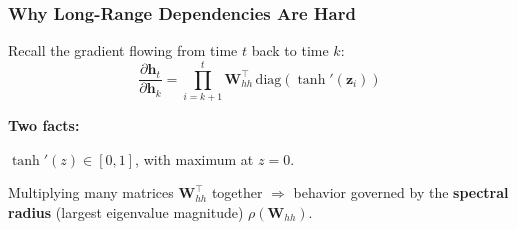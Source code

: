 \documentclass[notes,11pt, aspectratio=169]{beamer}
\newenvironment{wideitemize}{\itemize\addtolength{\itemsep}{10pt}}{\enditemize}
\newcommand{\vh}{\mathbf{h}}
\newcommand{\vz}{\mathbf{z}}
\newcommand{\vW}{\mathbf{W}}
\newcommand{\pd}[2]{\frac{\partial #1}{\partial #2}}
\begin{document}
\begin{frame}
\frametitle{Why Long-Range Dependencies Are Hard}

Recall the gradient flowing from time $t$ back to time $k$:
\[
    \pd{\vh_t}{\vh_k} = \prod_{i=k+1}^{t} \vW_{hh}^\top \, \mathrm{diag}(\tanh'(\vz_i))
\]

\vspace{4pt}
\textbf{Two facts:}
\begin{wideitemize}
    \item $\tanh'(z) \in [0, 1]$, with maximum at $z = 0$.
    \item Multiplying many matrices $\vW_{hh}^\top$ together $\Rightarrow$ behavior governed by the \textbf{spectral radius} (largest eigenvalue magnitude) $\rho(\vW_{hh})$.
\end{wideitemize}

\vspace{8pt}
\end{frame}
\end{document}
